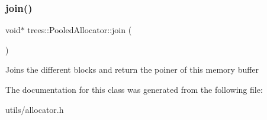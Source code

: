 \mbox{\label{classtrees_1_1_pooled_allocator_a48598296a62c31931cbcd1d8fb61f43f}} 
\subsubsection{\texorpdfstring{join()}{join()}}
{\footnotesize\ttfamily void$\ast$ trees\+::\+Pooled\+Allocator\+::join (\begin{DoxyParamCaption}{ }\end{DoxyParamCaption})\hspace{0.3cm}{\ttfamily [inline]}}

Joins the different blocks and return the poiner of this memory buffer 

The documentation for this class was generated from the following file\+:\begin{DoxyCompactItemize}
\item 
utils/allocator.\+h\end{DoxyCompactItemize}
